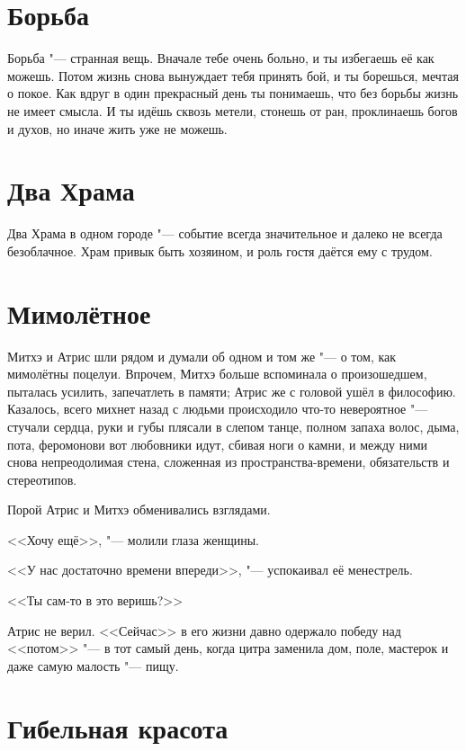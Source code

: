 \section{Борьба}

Борьба "--- странная вещь.
Вначале тебе очень больно, и ты избегаешь её как можешь.
Потом жизнь снова вынуждает тебя принять бой, и ты борешься, мечтая о покое.
Как вдруг в один прекрасный день ты понимаешь, что без борьбы жизнь не имеет смысла.
И ты идёшь сквозь метели, стонешь от ран, проклинаешь богов и духов, но иначе жить уже не можешь.

\section{Два Храма}

Два Храма в одном городе "--- событие всегда значительное и далеко не всегда безоблачное.
Храм привык быть хозяином, и роль гостя даётся ему с трудом.

\section{Мимолётное}

Митхэ и Атрис шли рядом и думали об одном и том же "--- о том, как мимолётны поцелуи.
Впрочем, Митхэ больше вспоминала о произошедшем, пыталась усилить, запечатлеть в памяти;
Атрис же с головой ушёл в философию.
Казалось, всего михнет назад с людьми происходило что-то невероятное "--- стучали сердца, руки и губы плясали в слепом танце, полном запаха волос, дыма, пота, феромонов\ldotst и вот любовники идут, сбивая ноги о камни, и между ними снова непреодолимая стена, сложенная из пространства-времени, обязательств и стереотипов.

Порой Атрис и Митхэ обменивались взглядами.

<<Хочу ещё>>, "--- молили глаза женщины.

<<У нас достаточно времени впереди>>, "--- успокаивал её менестрель.

<<Ты сам-то в это веришь?>>

Атрис не верил.
<<Сейчас>> в его жизни давно одержало победу над <<потом>> "--- в тот самый день, когда цитра заменила дом, поле, мастерок и даже самую малость "--- пищу.

\section{Гибельная красота}


